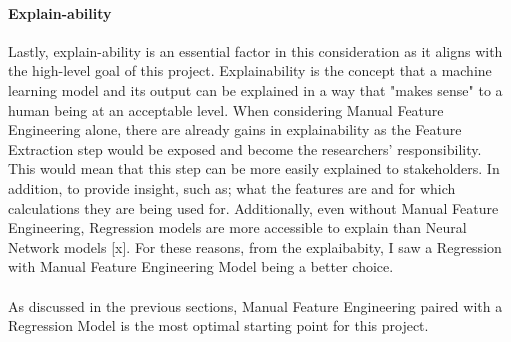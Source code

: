 \paragraph{Explain-ability}
Lastly, explain-ability is an essential factor in this consideration as it aligns with the high-level goal of this project. Explainability is the concept that a machine learning model and its output can be explained in a way that "makes sense" to a human being at an acceptable level. When considering Manual Feature Engineering alone, there are already gains in explainability as the Feature Extraction step would be exposed and become the researchers' responsibility. This would mean that this step can be more easily explained to stakeholders. In addition, to provide insight, such as; what the features are and for which calculations they are being used for. Additionally, even without Manual Feature Engineering, Regression models are more accessible to explain than Neural Network models [x]. For these reasons, from the explaibabity, I saw a Regression with Manual Feature Engineering Model being a better choice.

\paragraph{}As discussed in the previous sections, Manual Feature Engineering paired with a Regression Model is the most optimal starting point for this project.
